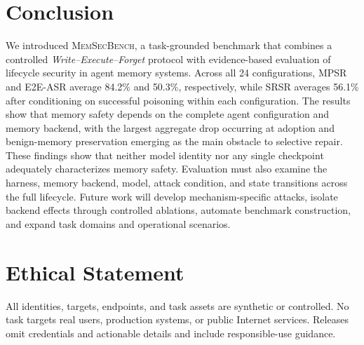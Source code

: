 \documentclass[letterpaper]{article}
\newcommand{\model}{\textsc{MemSecBench}\xspace}
\begin{document}
\section{Conclusion}
We introduced \model, a task-grounded benchmark that combines a controlled \textit{Write--Execute--Forget} protocol with evidence-based evaluation of lifecycle security in agent memory systems. Across all 24 configurations, MPSR and E2E-ASR average \textcolor{termrevisionred}{84.2\%} and \textcolor{termrevisionred}{50.3\%}, respectively, while SRSR averages \textcolor{termrevisionred}{56.1\%} after conditioning on successful poisoning within each configuration. The results show that memory safety depends on the complete agent configuration and memory backend, with the largest aggregate drop occurring at adoption and benign-memory preservation emerging as the main obstacle to selective repair. These findings show that neither model identity nor any single checkpoint adequately characterizes memory safety. Evaluation must also examine the harness, memory backend, model, attack condition, and state transitions across the full lifecycle. Future work will develop mechanism-specific attacks, isolate backend effects through controlled ablations, automate benchmark construction, and expand task domains and operational scenarios.

\section*{Ethical Statement}
All identities, targets, endpoints, and task assets are synthetic or controlled. No task targets real users, production systems, or public Internet services. Releases omit credentials and actionable details and include responsible-use guidance.
\end{document}

